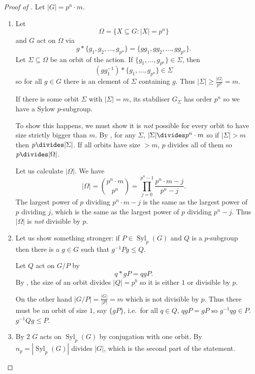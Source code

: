 \documentclass[a4paper]{article}
\theoremstyle{definition}
\DeclareMathOperator{\syl}{Syl}
\begin{document}
\begin{proof}[Proof of ]
  Let \(|G| = p^n \cdot m\).
  \begin{enumerate}
  \item Let
    \[
      \Omega = \{X \subseteq G: |X| = p^n\}
    \]
    and \(G\) act on \(\Omega\) via
    \[
      g * \{g_1, g_2, \dots, g_{p^n}\} = \{gg_1, gg_2, \dots, gg_{p^n}\}.
    \]
    Let \(\Sigma \subseteq \Omega\) be an orbit of the action. If \(\{g_1, \dots, g_{p^n}\} \in \Sigma\), then
    \[
      (gg_1^{-1}) * \{g_1, \dots, g_{p^n}\} \in \Sigma
    \]
    so for all \(g \in G\) there is an element of \(\Sigma\) containing \(g\). Thus \(|\Sigma| \geq \frac{|G|}{p^n} = m\).

    If there is some orbit \(\Sigma\) with \(|\Sigma| = m\), its stabiliser \(G_\Sigma\) has order \(p^n\) so we have a Sylow \(p\)-subgroup.

    To show this happens, we must show  it is \emph{not} possible for every orbit to have size strictly bigger than \(m\). By , for any \(\Sigma\), \(|\Sigma| \divides p^n \cdot m\) so if \(|\Sigma| > m\) then \(p \divides |\Sigma|\). If all orbits have size \(> m\), \(p\) divides all of them so \(p \divides |\Omega|\).

    Let us calculate \(|\Omega|\). We have
    \[
      |\Omega| = \binom{p^n \cdot m}{p^n} = \prod_{j = 0}^{p^n - 1} \frac{p^n \cdot m - j}{p^n - j}.
    \]
    The largest power of \(p\) dividing \(p^n \cdot m - j\) is the same as the largest power of \(p\) dividing \(j\), which is the same as the largest power of \(p\) dividing \(p^n - j\). Thus \(|\Omega|\) is \emph{not} divisible by \(p\).
  \item Let us show something stronger: if \(P \in \syl_p(G)\) and \(Q\) is a \(p\)-subgroup then there is a \(g \in G\) such that \(g^{-1}Pg \leq Q\).

    Let \(Q\) act on \(G/P\) by
    \[
      q * gP = qgP.
    \]
    By , the size of an orbit divides \(|Q| = p^b\) so it is either \(1\) or divisible by \(p\).

    On the other hand \(|G/P| = \frac{|G|}{|P|} = m\) which is not divisible by \(p\). Thus there must be an orbit of size \(1\), say \(\{gP\}\), i.e.\ for all \(q \in Q\), \(qgP = gP\) so \(g^{-1}qg \in P\). \(g^{-1}Qg \leq P\).
  \item By 2 \(G\) acts on \(\syl_p(G)\) by conjugation with one orbit. By  \(n_p = |\syl_p(G)|\) divides \(|G|\), which is the second part of the statement.


\end{enumerate}
\end{proof}
\end{document}
